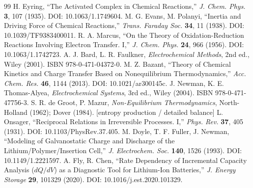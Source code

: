 \documentclass[11pt,a4paper]{article}
\newcommand{\brk}{\discretionary{}{}{}}%
\begin{document}
\begin{thebibliography}{99}
 H. Eyring, ``The Activated Complex in Chemical Reactions,'' \emph{J. Chem. Phys.}
  \textbf{3}, 107 (1935). DOI: 10.1063/1.1749604.
 M. G. Evans, M. Polanyi, ``Inertia and Driving Force of Chemical Reactions,''
  \emph{Trans. Faraday Soc.} \textbf{34}, 11 (1938). DOI: 10.1039/TF9383400011.
 R. A. Marcus, ``On the Theory of Oxidation-Reduction Reactions Involving Electron
  Transfer. I,'' \emph{J. Chem. Phys.} \textbf{24}, 966 (1956). DOI: 10.1063/\brk 1.1742723.
 A. J. Bard, L. R. Faulkner, \emph{Electrochemical Methods}, 2nd ed., Wiley (2001).
  ISBN 978-0-\brk 471-04372-0.
 M. Z. Bazant, ``Theory of Chemical Kinetics and Charge Transfer Based on
  Nonequilibrium Thermodynamics,'' \emph{Acc. Chem. Res.} \textbf{46}, 1144 (2013).
  DOI: 10.1021/\brk ar300145c.
 J. Newman, K. E. Thomas-Alyea, \emph{Electrochemical Systems}, 3rd ed., Wiley (2004).
  ISBN 978-0-\brk 471-47756-3.
 S. R. de Groot, P. Mazur, \emph{Non-Equilibrium Thermodynamics},
  North-Holland (1962); Dover (1984). [entropy production / detailed balance]
 L. Onsager, ``Reciprocal Relations in Irreversible Processes. I,'' \emph{Phys. Rev.}
  \textbf{37}, 405 (1931). DOI: 10.1103/\brk PhysRev.37.405.
 M. Doyle, T. F. Fuller, J. Newman, ``Modeling of Galvanostatic Charge and Discharge
  of the Lithium/Polymer/Insertion Cell,'' \emph{J. Electrochem. Soc.} \textbf{140}, 1526 (1993).
  DOI: 10.1149/\brk 1.2221597.
 A. Fly, R. Chen, ``Rate Dependency of Incremental Capacity Analysis ($dQ/dV$) as a
  Diagnostic Tool for Lithium-Ion Batteries,'' \emph{J. Energy Storage} \textbf{29}, 101329 (2020).
  DOI: 10.1016/\brk j.est.2020.101329.
\end{thebibliography}
\end{document}
